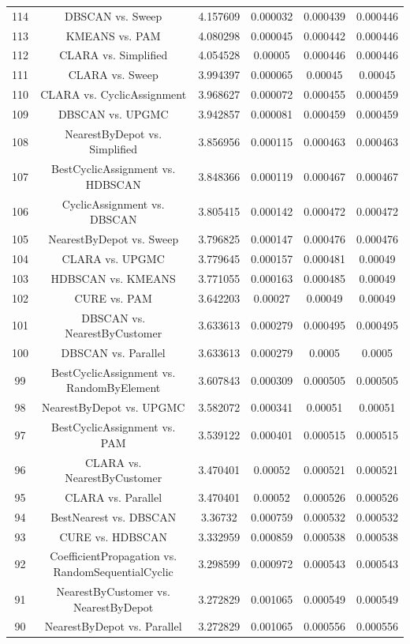 \documentclass[a4paper,10pt]{article}
\begin{document}
\begin{landscape}
\begin{table}[!htp]
\begin{tabular}{cccccc}
114&DBSCAN vs. Sweep&4.157609&0.000032&0.000439&0.000446\\
113&KMEANS vs. PAM&4.080298&0.000045&0.000442&0.000446\\
112&CLARA vs. Simplified&4.054528&0.00005&0.000446&0.000446\\
111&CLARA vs. Sweep&3.994397&0.000065&0.00045&0.00045\\
110&CLARA vs. CyclicAssignment&3.968627&0.000072&0.000455&0.000459\\
109&DBSCAN vs. UPGMC&3.942857&0.000081&0.000459&0.000459\\
108&NearestByDepot vs. Simplified&3.856956&0.000115&0.000463&0.000463\\
107&BestCyclicAssignment vs. HDBSCAN&3.848366&0.000119&0.000467&0.000467\\
106&CyclicAssignment vs. DBSCAN&3.805415&0.000142&0.000472&0.000472\\
105&NearestByDepot vs. Sweep&3.796825&0.000147&0.000476&0.000476\\
104&CLARA vs. UPGMC&3.779645&0.000157&0.000481&0.00049\\
103&HDBSCAN vs. KMEANS&3.771055&0.000163&0.000485&0.00049\\
102&CURE vs. PAM&3.642203&0.00027&0.00049&0.00049\\
101&DBSCAN vs. NearestByCustomer&3.633613&0.000279&0.000495&0.000495\\
100&DBSCAN vs. Parallel&3.633613&0.000279&0.0005&0.0005\\
99&BestCyclicAssignment vs. RandomByElement&3.607843&0.000309&0.000505&0.000505\\
98&NearestByDepot vs. UPGMC&3.582072&0.000341&0.00051&0.00051\\
97&BestCyclicAssignment vs. PAM&3.539122&0.000401&0.000515&0.000515\\
96&CLARA vs. NearestByCustomer&3.470401&0.00052&0.000521&0.000521\\
95&CLARA vs. Parallel&3.470401&0.00052&0.000526&0.000526\\
94&BestNearest vs. DBSCAN&3.36732&0.000759&0.000532&0.000532\\
93&CURE vs. HDBSCAN&3.332959&0.000859&0.000538&0.000538\\
92&CoefficientPropagation vs. RandomSequentialCyclic&3.298599&0.000972&0.000543&0.000543\\
91&NearestByCustomer vs. NearestByDepot&3.272829&0.001065&0.000549&0.000549\\
90&NearestByDepot vs. Parallel&3.272829&0.001065&0.000556&0.000556\\

\end{tabular}
\end{table}
\end{landscape}
\end{document}
